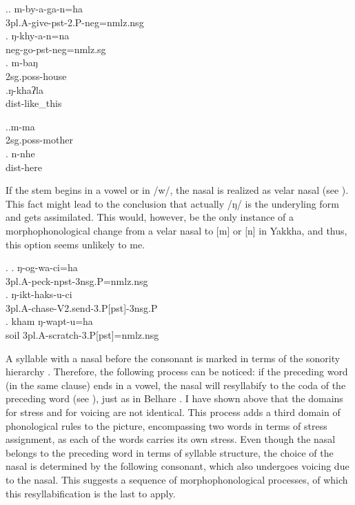 			
\ex.\ag.	m-by-a-ga-n=ha\\
			{\sc 3pl.A-}give{\sc -pst-2.P-neg=nmlz.nsg}\\
			\bg. ŋ-khy-a-n=na\\
			{\sc neg-}go{\sc [3sg]-pst-neg=nmlz.sg}\\
			\bg.	m-baŋ\\
			{\sc 2sg.poss-}house\\
			\bg.ŋ-khaʔla\\
			{\sc dist-}like\_this\\
			
			
			\ex.\ag.m-ma\\
			{\sc 2sg.poss-}mother\\
			\bg. n-nhe\\
			{\sc dist-}here\\

			
If the stem begins in a vowel or in /w/, the nasal is realized as velar nasal (see \Next). This fact might lead to the conclusion that actually /ŋ/ is the underyling form and gets assimilated. This would, however, be the only instance of a morphophonological change from a velar nasal to [m] or [n] in Yakkha, and thus, this option seems unlikely to me.


\ex. \ag. ŋ-og-wa-ci=ha\\
			{\sc 3pl.A-}peck{\sc -npst-3nsg.P=nmlz.nsg}\\
	\bg. ŋ-ikt-haks-u-ci\\
			{\sc 3pl.A-}chase{\sc -V2.send-3.P[pst]-3nsg.P}\\
	\bg. kham ŋ-wapt-u=ha\\
			soil  {\sc 3pl.A-}scratch{\sc -3.P[pst]=nmlz.nsg}\\


A syllable with a nasal before the consonant is marked in terms of the sonority hierarchy \citep{Jespersen1904_Lehrbuch, Selkirk1984_SyllableTheory, Hall2000Phonologie}. Therefore, the following  process can be noticed: if the preceding word (in the same clause) ends in a vowel, the nasal will resyllabify to the coda of the preceding word (see \Next), just as in Belhare \citep[547]{Bickel2003Belhare}. I have shown above that the domains for stress and for voicing are not identical. This process adds a third domain of phonological rules to the picture, encompassing two words in terms of stress assignment, as each of the words carries its own stress. Even though the nasal belongs to the preceding word in terms of syllable structure, the choice of the nasal is determined by the following consonant, which also undergoes voicing due to the nasal. This suggests a sequence of morphophonological processes, of which this resyllabification is the last to apply.    


